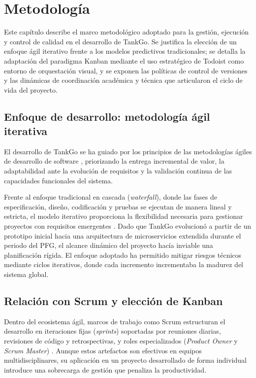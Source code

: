 
\chapter{Metodología}
Este capítulo describe el marco metodológico adoptado para la gestión, ejecución y control
de calidad en el desarrollo de TankGo. Se justifica la elección de un enfoque ágil iterativo
frente a los modelos predictivos tradicionales; se detalla la adaptación del paradigma Kanban
mediante el uso estratégico de Todoist como entorno de orquestación visual, y se exponen las políticas
de control de versiones y las dinámicas de coordinación académica y técnica que articularon el ciclo
de vida del proyecto.

\section{Enfoque de desarrollo: metodología ágil iterativa}
El desarrollo de TankGo se ha guiado por los principios de las metodologías ágiles de desarrollo
de software \cite{sommerville2011}, priorizando la entrega incremental de valor, la adaptabilidad
ante la evolución de requisitos y la validación continua de las capacidades funcionales del sistema.

Frente al enfoque tradicional en cascada (\textit{waterfall}), donde las fases de especificación,
diseño, codificación y pruebas se ejecutan de manera lineal y estricta, el modelo iterativo proporciona
la flexibilidad necesaria para gestionar proyectos con requisitos emergentes \cite{sommerville2011}. Dado
que TankGo evolucionó a partir de un prototipo inicial hacia una arquitectura de microservicios extendida
durante el periodo del PFG, el alcance dinámico del proyecto hacía inviable una planificación rígida.
El enfoque adoptado ha permitido mitigar riesgos técnicos mediante ciclos iterativos, donde cada incremento
incrementaba la madurez del sistema global.

\section{Relación con Scrum y elección de Kanban}
Dentro del ecosistema ágil, marcos de trabajo como Scrum estructuran el desarrollo en iteraciones
fijas (\textit{sprints}) soportadas por reuniones diarias, revisiones de código y retrospectivas,
y roles especializados (\textit{Product Owner} y \textit{Scrum Master}) \cite{anderson2010kanban}.
Aunque estos artefactos son efectivos en equipos multidisciplinares, su aplicación en un proyecto
desarrollado de forma individual introduce una sobrecarga de gestión que penaliza la productividad.

